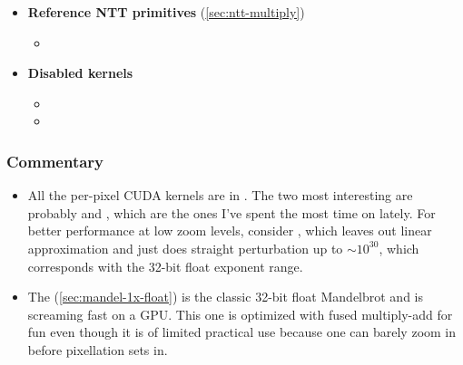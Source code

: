 \begin{itemize}
\item \textbf{Reference NTT primitives} (\cref{sec:ntt-multiply})
  \begin{itemize}
    \item {}
  \end{itemize}

\item \textbf{Disabled kernels}
  \begin{itemize}
    \item {}
    \item {}
  \end{itemize}

\end{itemize}

\subsubsection{Commentary}

\begin{itemize}

\item All the per-pixel CUDA kernels are in . The two
most interesting are probably  and
, which are the ones I've spent the
most time on lately. For better performance at low zoom levels, consider
, which leaves out linear approximation
and just does straight perturbation up to $\sim 10^{30}$, which corresponds
with the 32-bit float exponent range.

\item The  (\cref{sec:mandel-1x-float}) is the classic 32-bit float Mandelbrot and 
is screaming fast on a GPU. This one is optimized with fused multiply-add for 
fun even though it is of limited practical use because one can barely zoom in before
pixellation sets in.

\end{itemize}

